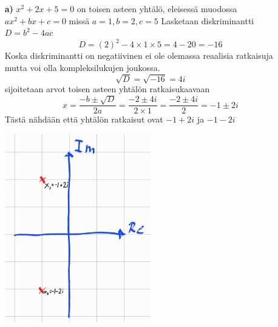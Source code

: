 \documentclass{article}
\begin{document}
\begin{itemize}
    \item [{\textbf{a)}}] $x^2 + 2x + 5 = 0$ on toisen asteen yhtälö, eleisessä muodossa $ax^2 + bx + c = 0$ 
    missä $a = 1, b = 2, c = 5$\newline
    Lasketaan diskriminantti $D = b^2 - 4ac$
    \[
        D = (2)^2 - 4 \times 1 \times 5 = 4 - 20 = -16
    \]
    Koska diskriminantti on negatiivinen ei ole olemassa reaalisia ratkaisuja mutta voi olla kompleksilukujen joukossa.
    \[
        \sqrt{D} = \sqrt{-16} = 4i
    \]
    sijoitetaan arvot toisen asteen yhtälön ratkaisukaavaan
    \[
        x = \frac{-b \pm \sqrt{D}}{2a} = \frac{-2 \pm 4i}{2 \times 1} = \frac{-2 \pm 4i}{2} = -1 \pm 2i
    \]
    Tästä nähdään että yhtälön ratkaisut ovat $-1 + 2i$ ja $-1 - 2i$

    \begin{center}
        \includegraphics[width=0.5\textwidth]{harj6teht6a.jpg}
    \end{center}



\end{itemize}
\end{document}
